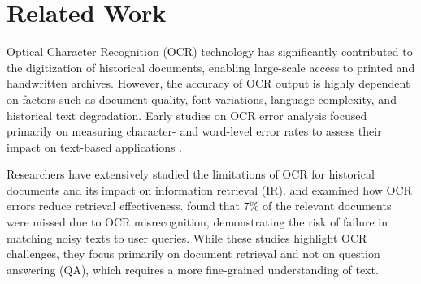 \section{Related Work}
Optical Character Recognition (OCR) technology has significantly contributed to the digitization of historical documents, enabling large-scale access to printed and handwritten archives. However, the accuracy of OCR output is highly dependent on factors such as document quality, font variations, language complexity, and historical text degradation. Early studies on OCR error analysis focused primarily on measuring character- and word-level error rates to assess their impact on text-based applications \cite{piotrowski2012natural, hill2019quantifying}.

Researchers have extensively studied the limitations of OCR for historical documents and its impact on information retrieval (IR). \citet{croft1994evaluation} and \citet{traub2015impact} examined how OCR errors reduce retrieval effectiveness. \citet{chiron2017impact} found that 7\% of the relevant documents were missed due to OCR misrecognition, demonstrating the risk of failure in matching noisy texts to user queries. While these studies highlight OCR challenges, they focus primarily on document retrieval and not on question answering (QA), which requires a more fine-grained understanding of text.

